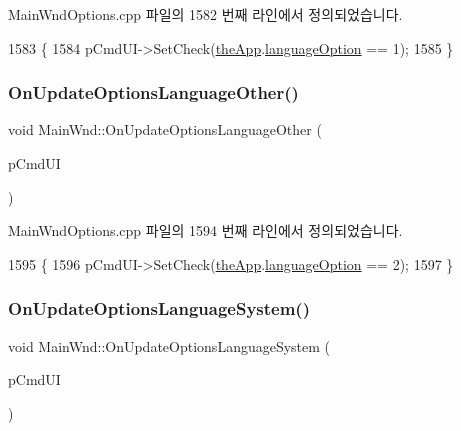 Main\+Wnd\+Options.\+cpp 파일의 1582 번째 라인에서 정의되었습니다.


\begin{DoxyCode}
1583 \{
1584   pCmdUI->SetCheck(\mbox{\hyperlink{_v_b_a_8cpp_a8095a9d06b37a7efe3723f3218ad8fb3}{theApp}}.\mbox{\hyperlink{class_v_b_a_ac747a07ec2db4bcddea1b4581ebe5c6b}{languageOption}} == 1);
1585 \}
\end{DoxyCode}
\mbox{\label{class_main_wnd_a253ed6fa2a8e7f58b8ad1fce6b45f70e}} 
\subsubsection{\texorpdfstring{On\+Update\+Options\+Language\+Other()}{OnUpdateOptionsLanguageOther()}}
{\footnotesize\ttfamily void Main\+Wnd\+::\+On\+Update\+Options\+Language\+Other (\begin{DoxyParamCaption}\item[{C\+Cmd\+UI $\ast$}]{p\+Cmd\+UI }\end{DoxyParamCaption})\hspace{0.3cm}{\ttfamily [protected]}}



Main\+Wnd\+Options.\+cpp 파일의 1594 번째 라인에서 정의되었습니다.


\begin{DoxyCode}
1595 \{
1596   pCmdUI->SetCheck(\mbox{\hyperlink{_v_b_a_8cpp_a8095a9d06b37a7efe3723f3218ad8fb3}{theApp}}.\mbox{\hyperlink{class_v_b_a_ac747a07ec2db4bcddea1b4581ebe5c6b}{languageOption}} == 2);
1597 \}
\end{DoxyCode}
\mbox{\label{class_main_wnd_a4f8798fc51757dbdff7f0b2bd7e93a82}} 
\subsubsection{\texorpdfstring{On\+Update\+Options\+Language\+System()}{OnUpdateOptionsLanguageSystem()}}
{\footnotesize\ttfamily void Main\+Wnd\+::\+On\+Update\+Options\+Language\+System (\begin{DoxyParamCaption}\item[{C\+Cmd\+UI $\ast$}]{p\+Cmd\+UI }\end{DoxyParamCaption})\hspace{0.3cm}{\ttfamily [protected]}}



